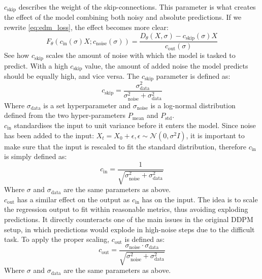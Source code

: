 $c_{\text{skip}}$ describes the weight of the skip-connections. This parameter is what creates the effect of the model combining both noisy and absolute predictions. If we rewrite \cref{eq:edm_loss}, the effect becomes more clear: 
\begin{equation}
    F_{\theta} \left( c_{\text{in}}(\sigma)X; c_{\text{noise}}(\sigma) \right) = \frac{D_{\theta}(X, \sigma) - c_{\text{skip}}(\sigma) X}{c_{\text{out}}(\sigma)}
\end{equation}
See how $c_{\text{skip}}$ scales the amount of noise with which the model is tasked to predict. With a high $c_{\text{skip}}$ value, the amount of added noise the model predicts should be equally high, and vice versa. The $c_{\text{skip}}$ parameter is defined as: 
\begin{equation}
    c_{\text{skip}} = \frac{\sigma_{\text{data}}^2}{\sigma_{\text{noise}}^2 + \sigma_{\text{data}}^2}
\end{equation}
Where $\sigma_{\text{data}}$ is a set hyperparameter and $\sigma_{\text{noise}}$ is a log-normal distribution defined from the two hyper-parameters $P_{\text{mean}}$ and $P_{\text{std}}$. \\
$c_{\text{in}}$ standardises the input to unit variance before it enters the model. Since noise has been added to the input: $X_t = X_0 + \epsilon, \epsilon \sim \mathcal{N}(0, \sigma^2 I)$, it is important to make sure that the input is rescaled to fit the standard distribution, therefore $c_{\text{in}}$ is simply defined as:
\begin{equation}
    c_{\text{in}} = \frac{1}{\sqrt{\sigma_{\text{noise}}^2 + \sigma_{\text{data}}^2}}
\end{equation}
Where $\sigma$ and $\sigma_{\text{data}}$ are the same parameters as above. \\
$c_{\text{out}}$ has a similar effect on the output as $c_{\text{in}}$ has on the input. The idea is to scale the regression output to fit within reasonable metrics, thus avoiding exploding predictions. It directly counteracts one of the main issues in the original DDPM setup, in which predictions would explode in high-noise steps due to the difficult task. To apply the proper scaling, $c_{\text{out}}$ is defined as:
\begin{equation}
    c_{\text{out}} = \frac{\sigma_{\text{noise}} \cdot \sigma_{\text{data}}}{\sqrt{\sigma_{\text{noise}}^2 + \sigma_{\text{data}}^2}}
\end{equation}
Where $\sigma$ and $\sigma_{\text{data}}$ are the same parameters as above.

